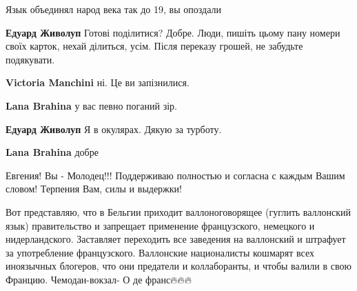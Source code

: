 \begin{itemize}
\begin{itemize}

Язык объединял народ века так до 19, вы опоздали


\textbf{Едуард Живолуп}
Готові поділитися? Добре.
Люди, пишіть цьому пану номери своїх карток, нехай ділиться, усім. \Laughey[1.0][white]
Після переказу грошей, не забудьте подякувати. \Laughey[1.0][white]


\textbf{Victoria Manchini} ні. Це ви запізнилися.


\textbf{Lana Brahina} у вас певно поганий зір.


\textbf{Едуард Живолуп}
Я в окулярах. \Laughey[1.0][white]Дякую за турботу.


\textbf{Lana Brahina} добре
\end{itemize}


Евгения! Вы - Молодец!!! Поддерживаю полностью и согласна с каждым Вашим
словом! Терпения Вам, силы и выдержки! \Smiley[1.0][yellow]




Вот представляю, что в Бельгии приходит валлоноговорящее (гуглить валлонский
язык) правительство и запрещает применение французского, немецкого и
нидерландского. Заставляет переходить все заведения на валлонский и штрафует за
употребление французского. Валлонские националисты кошмарят всех иноязычных
блогеров, что они предатели и коллаборанты, и чтобы валили в свою Францию.
Чемодан-вокзал- О де франс🔥🔥🔥

\begin{itemize}


\end{itemize}
\end{itemize}
